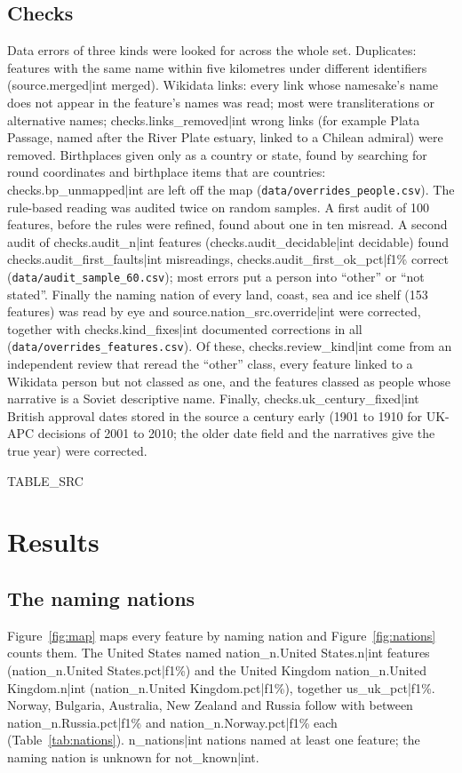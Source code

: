 \documentclass[11pt,a4paper]{article}
\begin{document}
\subsection{Checks}
Data errors of three kinds were looked for across the whole set. Duplicates: features with the same name within five kilometres under different identifiers ({{source.merged|int}} merged). Wikidata links: every link whose namesake's name does not appear in the feature's names was read; most were transliterations or alternative names; {{checks.links_removed|int}} wrong links (for example Plata Passage, named after the River Plate estuary, linked to a Chilean admiral) were removed. Birthplaces given only as a country or state, found by searching for round coordinates and birthplace items that are countries: {{checks.bp_unmapped|int}} are left off the map (\texttt{data/overrides\_people.csv}). The rule-based reading was audited twice on random samples. A first audit of 100 features, before the rules were refined, found about one in ten misread. A second audit of {{checks.audit_n|int}} features ({{checks.audit_decidable|int}} decidable) found {{checks.audit_first_faults|int}} misreadings, {{checks.audit_first_ok_pct|f1}}\% correct (\texttt{data/audit\_sample\_60.csv}); most errors put a person into ``other'' or ``not stated''. Finally the naming nation of every land, coast, sea and ice shelf (153 features) was read by eye and {{source.nation_src.override|int}} were corrected, together with {{checks.kind_fixes|int}} documented corrections in all (\texttt{data/overrides\_features.csv}). Of these, {{checks.review_kind|int}} come from an independent review that reread the ``other'' class, every feature linked to a Wikidata person but not classed as one, and the features classed as people whose narrative is a Soviet descriptive name. Finally, {{checks.uk_century_fixed|int}} British approval dates stored in the source a century early (1901 to 1910 for UK-APC decisions of 2001 to 2010; the older date field and the narratives give the true year) were corrected.

{{TABLE_SRC}}

\section{Results}
\subsection{The naming nations}
Figure~\ref{fig:map} maps every feature by naming nation and Figure~\ref{fig:nations} counts them. The United States named {{nation_n.United States.n|int}} features ({{nation_n.United States.pct|f1}}\%) and the United Kingdom {{nation_n.United Kingdom.n|int}} ({{nation_n.United Kingdom.pct|f1}}\%), together {{us_uk_pct|f1}}\%. Norway, Bulgaria, Australia, New Zealand and Russia follow with between {{nation_n.Russia.pct|f1}}\% and {{nation_n.Norway.pct|f1}}\% each (Table~\ref{tab:nations}). {{n_nations|int}} nations named at least one feature; the naming nation is unknown for {{not_known|int}}.
\end{document}
